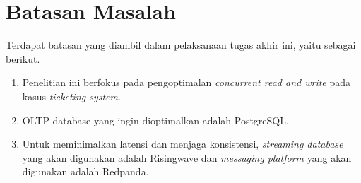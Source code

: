 \section{Batasan Masalah}
\label{sec:batasan-masalah}

Terdapat batasan yang diambil dalam pelaksanaan tugas akhir ini, yaitu sebagai berikut.

\begin{enumerate}
  \item Penelitian ini berfokus pada pengoptimalan \textit{concurrent read and write} pada kasus \textit{ticketing system}.
  \item OLTP database yang ingin dioptimalkan adalah PostgreSQL.
  \item Untuk meminimalkan latensi dan menjaga konsistensi, \textit{streaming database} yang akan digunakan adalah Risingwave dan \textit{messaging platform} yang akan digunakan adalah Redpanda.
\end{enumerate}

